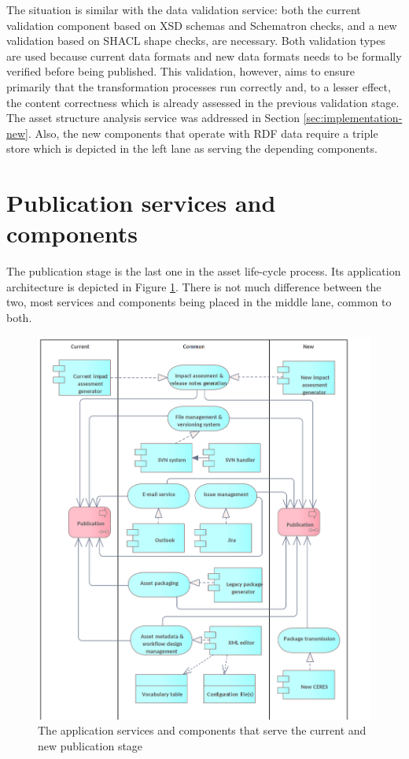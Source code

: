 	The situation is similar with the data validation service: both the current validation component based on XSD schemas and Schematron checks, and a new validation based on SHACL shape checks, are necessary. Both validation types are used because current data formats and new data formats needs to be formally verified before being published. This validation, however, aims to ensure primarily that the transformation processes run correctly and, to a lesser effect, the content correctness which is already assessed in the previous validation stage. The asset structure analysis service was addressed in Section \ref{sec:implementation-new}. Also, the new components that operate with RDF data require a triple store which is depicted in the left lane as serving the depending components.
	
	
	\section{Publication services and components}
	\label{sec:publication-application}	
	
	The publication stage is the last one in the asset life-cycle process. Its application architecture is depicted in Figure \ref{fig:application-publication}. There is not much difference between the two, most services and components being placed in the middle lane, common to both. 
	
	\begin{figure}[!h]
		\centering
		\includegraphics[width=.9\textwidth]{images/application/Publication v3.png}
		\caption{The application services and components that serve the current and new publication stage}
		\label{fig:application-publication}
	\end{figure}


